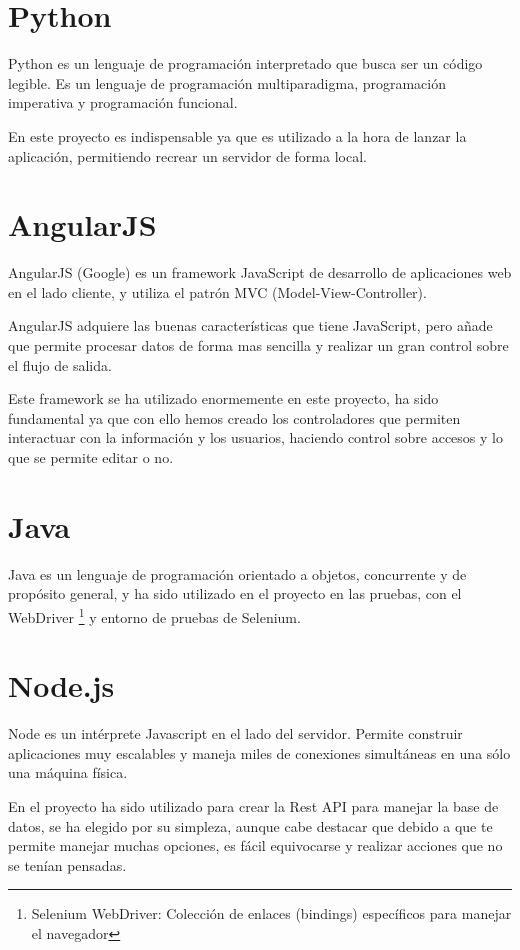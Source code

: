 \section{Python}\label{python}

Python es un lenguaje de programación interpretado que busca ser un código legible. Es un lenguaje de programación multiparadigma, programación imperativa y programación funcional.

En este proyecto es indispensable ya que es utilizado a la hora de lanzar la aplicación, permitiendo recrear un servidor de forma local.

\section{AngularJS}\label{AngularJS}

AngularJS (Google) es un framework JavaScript de desarrollo de aplicaciones web en el lado cliente, y utiliza el patrón MVC (Model-View-Controller).

AngularJS adquiere las buenas características que tiene JavaScript, pero añade que permite procesar datos de forma mas sencilla y realizar un gran control sobre el flujo de salida.

Este framework se ha utilizado enormemente en este proyecto, ha sido fundamental ya que con ello hemos creado los controladores que permiten interactuar con la información y los usuarios, haciendo control sobre accesos y lo que se permite editar o no.

\section{Java}\label{java}

Java es un lenguaje de programación orientado a objetos, concurrente y de propósito general, y ha sido utilizado en el proyecto en las pruebas, con el WebDriver \footnote{Selenium WebDriver: Colección de enlaces (bindings) específicos para manejar el navegador} y entorno de pruebas de Selenium.

\section{Node.js}\label{Node.js}

Node es un intérprete Javascript en el lado del servidor. Permite construir aplicaciones muy escalables y  maneja miles de conexiones simultáneas en una sólo una máquina física.

En el proyecto ha sido utilizado para crear la Rest API para manejar la base de datos, se ha elegido por su simpleza, aunque cabe destacar que debido a que te permite manejar muchas opciones, es fácil equivocarse y realizar acciones que no se tenían pensadas.

